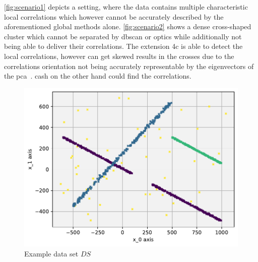\autoref{fig:scenario1}  depicts a setting, where the data contains multiple characteristic local correlations which however cannot be accurately described by the aforementioned global methods alone. 
\autoref{fig:scenario2} shows a dense cross-shaped cluster which cannot be separated by \gls{dbscan} or \gls{optics} while additionally not being able to deliver their correlations. 
The extension \gls{4c} is able to detect the local correlations, however can get skewed results in the crosses due to the correlations orientation not being accurately representable by the eigenvectors of the \gls{pca}~\cite{PCAshlens2014tutorial}. 
\gls{cash} on the other hand could find the correlations. 

\begin{figure}
    \centering
    \includegraphics[width=.7\textwidth]{figures_method/Groundtruth.pdf}
    \caption{Example data set $DS$}
    \label{fig:localglobalproblem}
\end{figure}

